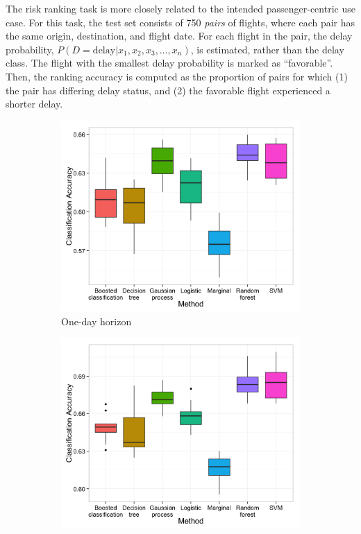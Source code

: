 \documentclass[twocolumn]{article}
\begin{document}
The risk ranking task is more closely related to the intended passenger-centric use case. For this task, the test set consists of 750 \emph{pairs} of flights, where each pair has the same origin, destination, and flight date. For each flight in the pair, the delay probability, $P(D=\text{delay}|x_1, x_2, x_3, \ldots, x_n)$, is estimated, rather than the delay class. The flight with the smallest delay probability is marked as ``favorable''. Then, the ranking accuracy is computed as the proportion of pairs for which (1) the pair has differing delay status, and (2) the favorable flight experienced a shorter delay.

\begin{figure}
    \centering
    \begin{subfigure}{0.45\textwidth}
        \centering
        \includegraphics[width=\linewidth]{figures/class-performance-sample-5000-OneDayHorizon.png}
        \caption{One-day horizon}
    \end{subfigure}
    \begin{subfigure}{0.45\textwidth}
        \centering
        \includegraphics[width=\linewidth]{figures/class-performance-sample-5000-OneMonthHorizon.png}

\end{subfigure}
\end{figure}
\end{document}
